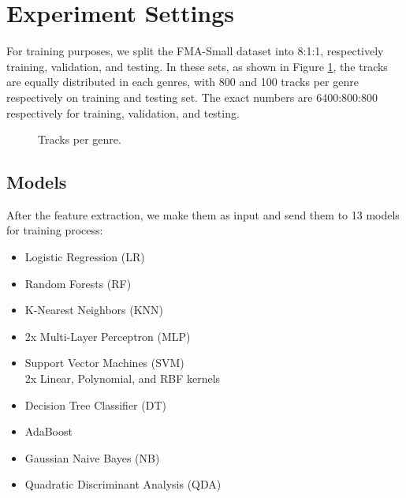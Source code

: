 \section{Experiment Settings}

For training purposes, we split the FMA-Small dataset into 8:1:1, respectively training, validation, and testing. In these sets, as shown in Figure \ref{fig:Tracks per genre}, the tracks are equally distributed in each genres, with 800 and 100 tracks per genre respectively on training and testing set. The exact numbers are 6400:800:800 respectively for training, validation, and testing.

\begin{figure}[b]
  \centering
  
  \caption{Tracks per genre.}
    \label{fig:Tracks per genre}
\end{figure}


\subsection{Models}
After the feature extraction, we make them as input and send them to 13 models for training process:

\begin{itemize}
    \item Logistic Regression (LR)
    \item Random Forests (RF)
    \item K-Nearest Neighbors (KNN)
    \item 2x Multi-Layer Perceptron (MLP)
    \item Support Vector Machines (SVM)\\2x Linear, Polynomial, and RBF kernels
    \item Decision Tree Classifier (DT)
    \item AdaBoost
    \item Gaussian Naive Bayes (NB)
    \item Quadratic Discriminant Analysis (QDA)
\end{itemize}
